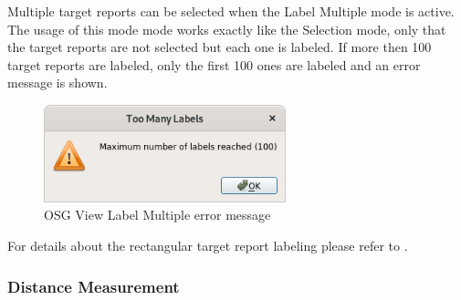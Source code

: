 Multiple target reports can be selected when the Label Multiple mode is active. \\

The usage of this mode mode works exactly like the Selection mode, only that the target reports are not selected but each one is labeled. If more then 100 target reports are labeled, only the first 100 ones are labeled and an error message is shown.

\begin{figure}[H]
    \center
    \includegraphics[width=7cm]{figures/osgview_label_multiple_error.png}
  \caption{OSG View Label Multiple error message}
\end{figure}

For details about the rectangular target report labeling please refer to .


% 
% 
% 


\subsubsection{Distance Measurement}

